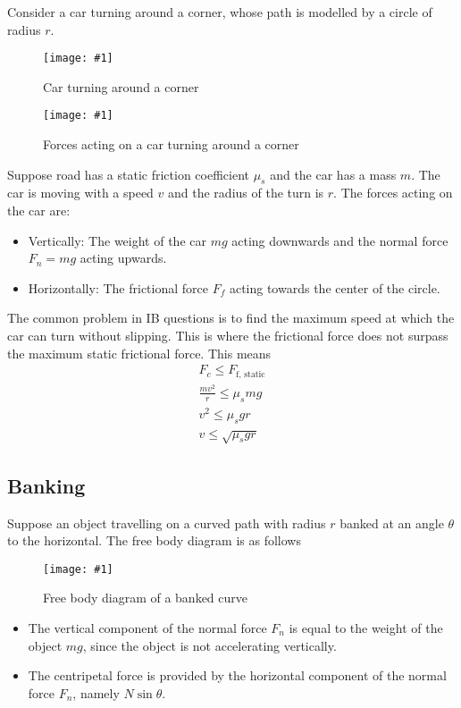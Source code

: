 \documentclass[a4paper,12pt]{article}
\newcommand{\img}[4]{\begin{center}
  \begin{figure}[H]
    \centering
    \texttt{[image: \#1]}
    \caption{#3}
    \label{fig:#4}
  \end{figure}
\end{center}}
\begin{document}
Consider a car turning around a corner, whose path is modelled by a circle of radius $r$.

\begin{minipage}{0.35\textwidth}
  \centering
  \img{material/turn1.png}{1}{Car turning around a corner}{carturn}
\end{minipage}\hspace{0.1\textwidth}%
\begin{minipage}{0.55\textwidth}
  \centering
  \img{material/turn2.png}{1}{Forces acting on a car turning around a corner}{carturnforces}
\end{minipage}


Suppose road has a static friction coefficient $\mu_s$ and the car has a mass $m$. The car is moving with a speed $v$ and the radius of the turn is $r$. The forces acting on the car are:
\begin{itemize}
  \item Vertically: The weight of the car $mg$ acting downwards and the normal force $F_n = mg$ acting upwards.
  \item Horizontally: The frictional force $F_f$ acting towards the center of the circle.
\end{itemize}

The common problem in IB questions is to find the maximum speed at which the car can turn without slipping. This is where the frictional force does not surpass the maximum static frictional force. This means
\begin{align*}
  F_c \le F_\text{f, static}  \\
  \frac{mv^2}{r} \le \mu_s mg \\
  v^2 \le \mu_s g r           \\
  v \le \sqrt{\mu_s g r}
\end{align*}

\pagebreak

\subsection{Banking}

Suppose an object travelling on a curved path with radius $r$ banked at an angle $\theta$ to the horizontal. The free body diagram is as follows
\img{material/banking.png}{0.4}{Free body diagram of a banked curve}{banking}
\begin{itemize}
  \item The vertical component of the normal force $F_n$ is equal to the weight of the object $mg$, since the object is not accelerating vertically.
  \item The centripetal force is provided by the horizontal component of the normal force $F_n$, namely $N \sin \theta$.
\end{itemize}
\end{document}
